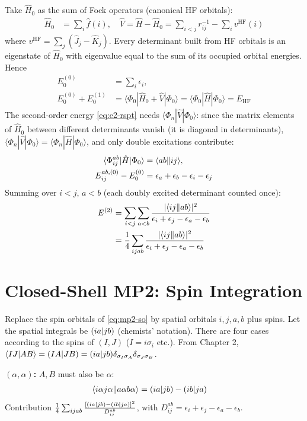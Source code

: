 Take $\hat{H}_0$ as the sum of Fock operators (canonical HF orbitals):
\begin{align*}
\hat{H}_0 &= \sum_i \hat{f}(i), \quad \hat{V} = \hat{H} - \hat{H}_0 = \sum_{i<j} r_{ij}^{-1} - \sum_i v^{\text{HF}}(i)
\end{align*}
where $v^{\mathrm{HF}} = \sum_j (\hat{J}_j - \hat{K}_j)$. Every determinant built from HF orbitals is an eigenstate of $\hat{H}_0$ with eigenvalue equal to the sum of its occupied orbital energies. Hence
\begin{align*}
E_0^{(0)} &= \sum_i \epsilon_i, \\
E_0^{(0)} + E_0^{(1)} &= \langle \Phi_0 | \hat{H}_0 + \hat{V} | \Phi_0 \rangle = \langle \Phi_0 | \hat{H} | \Phi_0 \rangle = E_{\text{HF}}
\end{align*}
The second-order energy \eqref{eq:e2-rspt} needs $\langle \Phi_n|\hat{V}|\Phi_0\rangle$: since the matrix elements of $\hat{H}_0$ between different determinants vanish (it is diagonal in determinants), $\langle \Phi_n|\hat{V}|\Phi_0\rangle = \langle \Phi_n|\hat{H}|\Phi_0\rangle$, and only double excitations contribute:
\begin{align*}
\langle \Phi_{ij}^{ab} | \hat{H} | \Phi_0 \rangle &= \langle ab\Vert ij\rangle, \\
E_{ij}^{ab,(0)} - E_0^{(0)} &= \epsilon_a + \epsilon_b - \epsilon_i - \epsilon_j
\end{align*}
Summing over $i < j$, $a < b$ (each doubly excited determinant counted once):
\begin{align}\label{eq:mp2-so}
E^{(2)} &= \sum_{i<j} \sum_{a<b} \frac{|\langle ij\Vert ab\rangle|^2}{\epsilon_i + \epsilon_j - \epsilon_a - \epsilon_b} \\
&= \frac{1}{4} \sum_{ijab} \frac{|\langle ij\Vert ab\rangle|^2}{\epsilon_i + \epsilon_j - \epsilon_a - \epsilon_b} \notag
\end{align}

\section{Closed-Shell MP2: Spin Integration}

Replace the spin orbitals of \eqref{eq:mp2-so} by spatial orbitals $i, j, a, b$ plus spins. Let the spatial integrals be $(ia\vert jb)$ (chemists' notation). There are four cases according to the spins of $(I, J)$ ($I = i \sigma_i$ etc.). From Chapter 2, $\langle IJ\vert AB\rangle = (IA\vert JB) = (ia\vert jb) \delta_{\sigma_I \sigma_A} \delta_{\sigma_J \sigma_B}$.

\textbf{$(\alpha, \alpha)$:} $A, B$ must also be $\alpha$:
\begin{align*}
\langle i\alpha j\alpha\Vert a\alpha b\alpha\rangle &= (ia\vert jb) - (ib\vert ja)
\end{align*}
Contribution $\frac{1}{4} \sum_{ijab} \frac{[(ia\vert jb) - (ib\vert ja)]^2}{D_{ij}^{ab}}$, with $D_{ij}^{ab} = \epsilon_i + \epsilon_j - \epsilon_a - \epsilon_b$.

